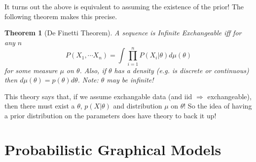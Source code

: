 \documentclass[]{article}
\theoremstyle{mattstyle}
\newtheorem{theorem}{Theorem}[section]
\theoremstyle{definition}
\begin{document}
It turns out the above is equivalent to assuming the existence of the prior! The following theorem makes this precise.

\begin{theorem}[De Finetti Theorem]
	A sequence is Infinite Exchangeable iff for any \(n\)
	$$ P(X_1, \cdots X_n) = \int\prod_{i=1}^n P(X_i|\theta)d\mu(\theta) $$
	for some measure \(\mu\) on \(\theta\). Also, if $\theta$ has a density (e.g. is discrete or continuous) then $d\mu(\theta) = p(\theta)d\theta$. Note: \(\theta\) may be infinite!
\end{theorem}

This theory says that, if we assume exchangable data (and iid $\Rightarrow$ exchangeable), then there must exist a \(\theta\), \(p(X|\theta)\) and distribution \(\mu\) on \(\theta\)! So the idea of having a prior distribution on the parameters does have theory to back it up!

\newpage

\section{Probabilistic Graphical Models}
\end{document}
